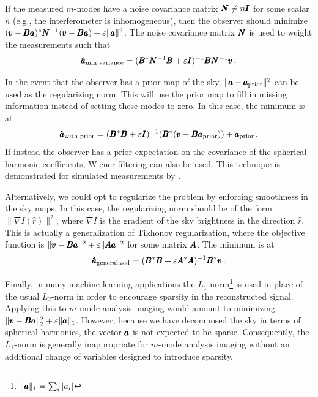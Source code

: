 \begin{bibunit}
If the measured $m$-modes have a noise covariance matrix $\pmb N \neq n\pmb I$ for some scalar $n$
(e.g., the interferometer is inhomogeneous), then the observer should minimize $(\pmb v-\pmb B\pmb a)^*\pmb
N^{-1}(\pmb v-\pmb B\pmb a) + \varepsilon\|\pmb a\|^2$. The noise covariance matrix $\pmb N$ is used to weight
the measurements such that
\begin{equation}
    \pmb{\hat a}_\text{min variance} = (\pmb B^*\pmb N^{-1}\pmb B + \varepsilon\pmb I)^{-1}
        \pmb B\pmb N^{-1}\pmb v\,.
\end{equation}

In the event that the observer has a prior map of the sky, $\|\pmb a - \pmb a_\text{prior}\|^2$ can be
used as the regularizing norm. This will use the prior map to fill in missing information instead of
setting these modes to zero. In this case, the minimum is at
\begin{equation}
    \pmb{\hat a}_\text{with prior} = (\pmb B^*\pmb B + \varepsilon\pmb I)^{-1}
        (\pmb B^*(\pmb v - \pmb B\pmb a_\text{prior}))
        + \pmb a_\text{prior}\,.
\end{equation}
If instead the observer has a prior expectation on the covariance of the spherical harmonic
coefficients, Wiener filtering can also be used.  This technique is demonstrated for simulated
measurements by \citet{2016arXiv161203255B}.

Alternatively, we could opt to regularize the problem by enforcing smoothness in the sky maps. In
this case, the regularizing norm should be of the form $\|\nabla I(\hat r)\|^2$, where $\nabla I$ is
the gradient of the sky brightness in the direction $\hat r$. This is actually a generalization of
Tikhonov regularization, where the objective function is $\|\pmb v-\pmb B\pmb a\|^2 + \varepsilon\|\pmb A\pmb
a\|^2$ for some matrix $\pmb A$. The minimum is at
\begin{equation}
    \pmb{\hat a}_\text{generalized} = (\pmb B^*\pmb B + \varepsilon\pmb A^*\pmb A)^{-1}\pmb B^*\pmb v\,.
\end{equation}

Finally, in many machine-learning applications the $L_1$-norm\footnote{
    $\|\pmb a\|_1 = \sum_i |a_i|$
} is used in place of the usual $L_2$-norm in order to encourage sparsity in the reconstructed
signal. Applying this to $m$-mode analysis imaging would amount to minimizing $\|\pmb v-\pmb B\pmb a\|_2^2
+ \varepsilon\|\pmb a\|_1$. However, because we have decomposed the sky in terms of spherical
harmonics, the vector $\pmb a$ is not expected to be sparse. Consequently, the $L_1$-norm is generally
inappropriate for $m$-mode analysis imaging without an additional change of variables designed to
introduce sparsity.


\end{bibunit}
